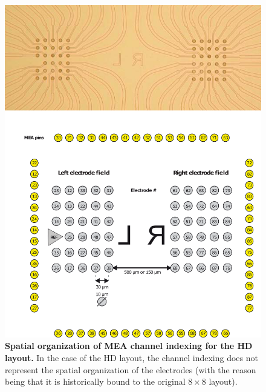 \newpage
        \begin{figure}[!h]
            \centering
            \includegraphics{appendix/HDLayout.png}
            \caption[Spatial organization of MEA channel indexing for the HD layout]{\textbf{Spatial organization of MEA channel indexing for the HD layout.} In the case of the HD layout, the channel indexing does not represent the spatial organization of the electrodes (with the reason being that it is historically bound to the original \(8 \times 8\) layout).}
            \label{fig:app:HDLayout}

        \end{figure}

\newpage

